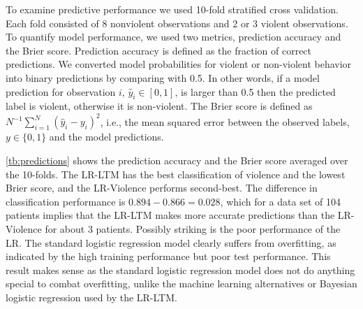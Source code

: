 \documentclass[a4paper,11pt]{article}
\begin{document}
To examine predictive performance we used 10-fold stratified cross validation.
Each fold consisted of 8 nonviolent observations and 2 or 3 violent observations.
To quantify model performance, we used two metrics, prediction accuracy and the Brier score.
Prediction accuracy is defined as the fraction of correct predictions.
We converted model probabilities for violent or non-violent behavior into binary predictions by comparing with 0.5. In other words, if a model prediction for observation $i$, $\hat{y}_i\in [0, 1]$, is larger than 0.5 then the predicted label is violent, otherwise it is non-violent.
The Brier score is defined as $N^{-1}\sum_{i=1}^N\left(\hat{y}_i-y_{i}\right)^2$, i.e., the mean squared error between the observed labels, $y\in\{0,1\}$ and the model predictions.

\autoref{tb:predictions} shows the prediction accuracy and the Brier score averaged over the 10-folds.
The LR-LTM has the best classification of violence and the lowest Brier score, and the LR-Violence performs second-best.
The difference in classification performance is $0.894 - 0.866 = 0.028$, which for a data set of 104 patients implies that the LR-LTM makes more accurate predictions than the LR-Violence for about 3 patients.
Possibly striking is the poor performance of the LR.
The standard logistic regression model clearly suffers from overfitting, as indicated by the high training performance but poor test performance. This result makes sense as the standard logistic regression model does not do anything special to combat overfitting, unlike the machine learning alternatives or Bayesian logistic regression used by the LR-LTM.
\end{document}
